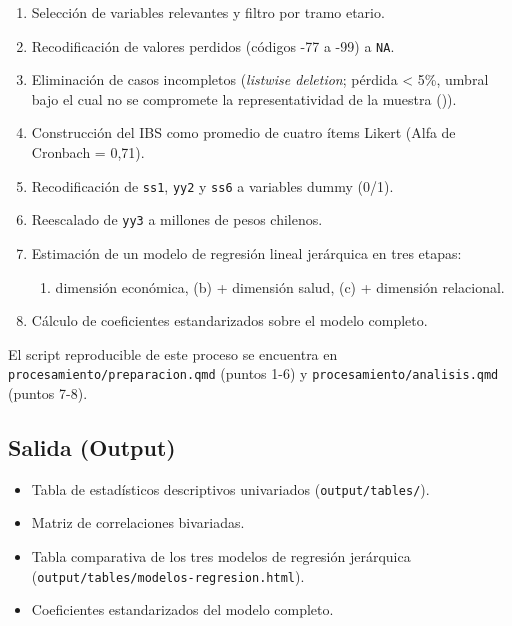 \documentclass[
  spanish,
  a4paper,
  oneside]{scrbook}
\providecommand{\tightlist}{%
  \setlength{\itemsep}{0pt}\setlength{\parskip}{0pt}}
\begin{document}
\begin{enumerate}
\def\labelenumi{\arabic{enumi}.}
\tightlist
\item
  Selección de variables relevantes y filtro por tramo etario.
\item
  Recodificación de valores perdidos (códigos -77 a -99) a \texttt{NA}.
\item
  Eliminación de casos incompletos (\emph{listwise deletion}; pérdida
  \textless{} 5\%, umbral bajo el cual no se compromete la
  representatividad de la muestra ()).
\item
  Construcción del IBS como promedio de cuatro ítems Likert (Alfa de
  Cronbach = 0,71).
\item
  Recodificación de \texttt{ss1}, \texttt{yy2} y \texttt{ss6} a
  variables dummy (0/1).
\item
  Reescalado de \texttt{yy3} a millones de pesos chilenos.
\item
  Estimación de un modelo de regresión lineal jerárquica en tres etapas:

  \begin{enumerate}
  \def\labelenumii{(\alph{enumii})}
  \tightlist
  \item
    dimensión económica, (b) + dimensión salud, (c) + dimensión
    relacional.
  \end{enumerate}
\item
  Cálculo de coeficientes estandarizados sobre el modelo completo.
\end{enumerate}

El script reproducible de este proceso se encuentra en
\texttt{procesamiento/preparacion.qmd} (puntos 1-6) y
\texttt{procesamiento/analisis.qmd} (puntos 7-8).

\subsection{Salida (Output)}\label{salida-output}

\begin{itemize}
\tightlist
\item
  Tabla de estadísticos descriptivos univariados
  (\texttt{output/tables/}).
\item
  Matriz de correlaciones bivariadas.
\item
  Tabla comparativa de los tres modelos de regresión jerárquica
  (\texttt{output/tables/modelos-regresion.html}).
\item
  Coeficientes estandarizados del modelo completo.
\end{itemize}
\end{document}
